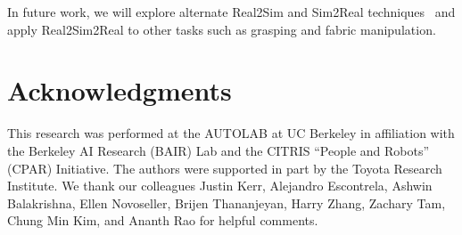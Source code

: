 \documentclass[letterpaper, 10pt, conference]{ieeeconf}  %
\begin{document}
In future work, we will explore alternate Real2Sim and Sim2Real techniques~\cite{auto-tune_2021,allevato2020tunenet,Fox-RSS-19,dynamics_randomization_2018} and apply Real2Sim2Real to other tasks such as grasping and fabric manipulation.
\section*{Acknowledgments}

{\footnotesize
This research was performed at the AUTOLAB at UC Berkeley in affiliation with the Berkeley AI Research (BAIR) Lab and the CITRIS ``People and Robots'' (CPAR) Initiative. The authors were supported in part by the Toyota Research Institute. We thank our colleagues Justin Kerr, Alejandro Escontrela, Ashwin Balakrishna, Ellen Novoseller, Brijen Thananjeyan, Harry Zhang, Zachary Tam, Chung Min Kim, and Ananth Rao for helpful comments.
}


% 
% 
\renewcommand*{\bibfont}{\footnotesize}
\printbibliography

% 
\end{document}
